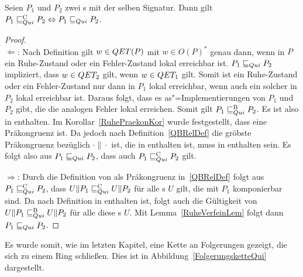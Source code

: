 \begin{Satz}
  \label{RuheVollAbstraktSatz}
  Seien $P_1$ und $P_2$ zwei \MEIO{}s mit der selben Signatur. Dann gilt
  $P_1 \sqsubseteq  _{Qui}^\mathrm{C} P_2\Leftrightarrow P_1 \sqsubseteq  _{Qui} P_2$.
\end{Satz}
\begin{proof}\mbox{}\\
  \glqq$\Leftarrow$\grqq{}: Nach Definition gilt $w\in QET (P)$ mit $w\in
  O(P)^*$ genau dann, wenn in $P$ ein Ruhe-Zustand oder ein Fehler-Zustand
  lokal erreichbar ist. $P_1 \sqsubseteq  _{Qui} P_2$ impliziert,
  dass $w\in QET _2$ gilt, wenn $w\in QET _1$ gilt. Somit ist ein Ruhe-Zustand
  oder ein Fehler-Zustand nur dann in $P_1$ lokal erreichbar, wenn auch ein
  solcher in $P_2$ lokal erreichbar ist. Daraus folgt, dass es
  as"=Implementierungen von $P_1$ und $P_2$ gibt, die die analogen Fehler lokal
  erreichen. Somit gilt $P_1 \sqsubseteq  _{Qui}^\mathrm{B} P_2$. Es ist also \QRel{} in \QBRel{}
  enthalten. Im Korollar~\ref{RuhePraekonKor} wurde festgestellt, dass \QRel{}
  eine Präkongruenz ist. Da jedoch \QCRel{} nach Definition~\ref{QBRelDef} die
  gröbste Präkongruenz bezüglich $\cdot\|\cdot$ ist, die in \QBRel{} enthalten
  ist, muss \QRel{} in \QCRel{} enthalten sein. Es folgt also aus $P_1 \sqsubseteq  _{Qui}
  P_2$, dass auch $P_1 \sqsubseteq  _{Qui}^\mathrm{C} P_2$ gilt.

  \glqq$\Rightarrow$\grqq{}: Durch die Definition von \QCRel{} als Präkongruenz
  in~\ref{QBRelDef} folgt aus $P_1 \sqsubseteq  _{Qui}^\mathrm{C} P_2$, dass $U\|P_1 \sqsubseteq  _{Qui}^\mathrm{C} U\|P_2$ für
  alle \MEIO{}s $U$ gilt, die mit $P_1$ komponierbar sind. Da \QCRel{} nach
  Definition in \QBRel{} enthalten ist, folgt auch die Gültigkeit von
  $U\|P_1 \sqsubseteq  _{Qui}^\mathrm{B} U\|P_2$ für alle diese \MEIO{}s $U$. Mit
  Lemma~\ref{RuheVerfeinLem} folgt dann $P_1 \sqsubseteq  _{Qui} P_2$.
\end{proof}

Es wurde somit, wie im letzten Kapitel, eine Kette an Folgerungen gezeigt, die
sich zu einem Ring schließen. Dies ist in Abbildung~\ref{FolgerungsketteQui}
dargestellt.

